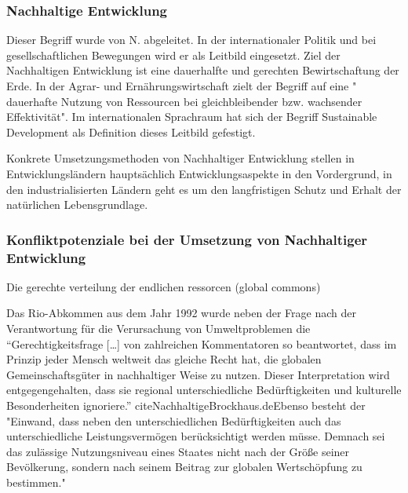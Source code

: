 \documentclass{article}
\begin{document}
\subsubsection{Nachhaltige Entwicklung}
 Dieser Begriff wurde von N. abgeleitet. In der internationaler Politik und bei gesellschaftlichen Bewegungen wird er als Leitbild eingesetzt. Ziel der Nachhaltigen Entwicklung ist eine dauerhalfte und gerechten Bewirtschaftung der Erde. \cite{NachhaltigeBrockhaus.de} In der Agrar- und Ernährungswirtschaft zielt der Begriff auf eine " dauerhafte Nutzung von Ressourcen bei gleichbleibender bzw. wachsender Effektivität". \cite{oppenhauser2010nachhaltigkeit} Im internationalen Sprachraum hat sich der Begriff Sustainable Development als Definition dieses Leitbild gefestigt.
 
 Konkrete Umsetzungsmethoden von Nachhaltiger Entwicklung stellen in Entwicklungsländern hauptsächlich Entwicklungsaspekte in den Vordergrund, in den industrialisierten Ländern geht es um den langfristigen Schutz und Erhalt der natürlichen Lebensgrundlage. 

\subsubsection{Konfliktpotenziale bei der Umsetzung von Nachhaltiger Entwicklung}

Die gerechte verteilung der endlichen ressorcen (global commons)

Das Rio-Abkommen aus dem Jahr 1992 wurde neben der Frage nach der Verantwortung für die Verursachung von Umweltproblemen die “Gerechtigkeitsfrage […] von zahlreichen Kommentatoren so beantwortet, dass im Prinzip jeder Mensch weltweit das gleiche Recht hat, die globalen Gemeinschaftsgüter in nachhaltiger Weise zu nutzen. Dieser Interpretation wird entgegengehalten, dass sie regional unterschiedliche Bedürftigkeiten und kulturelle Besonderheiten ignoriere.” cite{NachhaltigeBrockhaus.de}Ebenso besteht der "Einwand, dass neben den unterschiedlichen Bedürftigkeiten auch das unterschiedliche Leistungsvermögen berücksichtigt werden müsse. Demnach sei das zulässige Nutzungsniveau eines Staates nicht nach der Größe seiner Bevölkerung, sondern nach seinem Beitrag zur globalen Wertschöpfung zu bestimmen." \cite{NachhaltigeBrockhaus.de}
\end{document}
